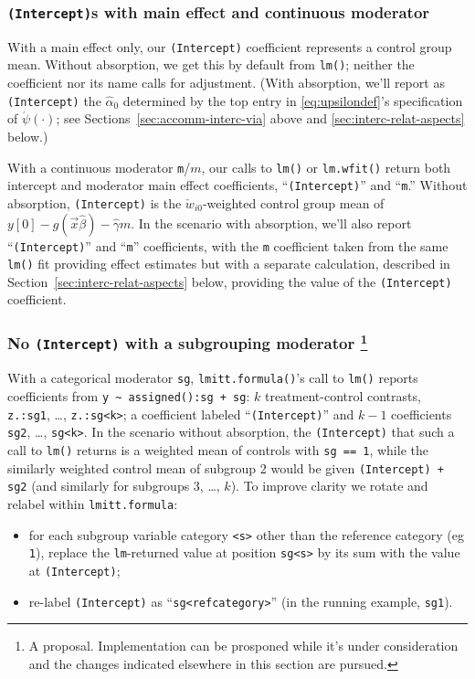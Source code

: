 \documentclass{article}
\newcommand{\owt}[1][{[z_{i}]}]{\ensuremath{\check{w}_{i#1}}}
\begin{document}
\subsubsection{\texttt{(Intercept)}s with main effect and continuous
  moderator}
With a main effect only, our \texttt{(Intercept)} coefficient
represents a control group mean. Without absorption, we get this by
default from \texttt{lm()}; neither the
coefficient nor its name calls for adjustment.  (With absorption, we'll
report as \texttt{(Intercept)} the $\hat{\alpha}_{0}$ determined by
the top entry in \eqref{eq:upsilondef}'s specification of
$\acute{\psi}(\cdot)$; see Sections~\ref{sec:accomm-interc-via} above
and \ref{sec:interc-relat-aspects} below.)

With a continuous moderator \texttt{m}/$m$, our calls to \texttt{lm()} or
\texttt{lm.wfit()} return both intercept and moderator main
effect coefficients, ``\texttt{(Intercept)}'' and ``\texttt{m}.''
Without absorption, \texttt{(Intercept)} is the $\owt[0]$-weighted control group mean of $y[0] - g(\vec{x}\hat\beta) -
\hat{\gamma}m$. In the scenario with absorption, we'll also report
``\texttt{(Intercept)}'' and ``\texttt{m}'' coefficients, with the
\texttt{m} coefficient taken from the same \texttt{lm()} fit providing
effect estimates but with a separate calculation, described in Section~\ref{sec:interc-relat-aspects} below,
providing the value of the \texttt{(Intercept)} coefficient. 

\subsubsection{No \texttt{(Intercept)} with a subgrouping
  moderator%
  \protect\footnote{A proposal. Implementation can be prosponed while
  it's under consideration and the changes indicated elsewhere in this
  section are pursued.}%
}
With a categorical moderator \texttt{sg}, \texttt{lmitt.formula()}'s call to
\texttt{lm()} reports coefficients from \texttt{y
  \textasciitilde\ assigned():sg + sg}: $k$ treatment-control contrasts,
\texttt{z.:sg1}, \ldots, \texttt{z.:sg<k>}; a
coefficient labeled ``\texttt{(Intercept)}'' and $k-1$
coefficients \texttt{sg2}, \ldots, \texttt{sg<k>}.  In the scenario
without absorption, the \texttt{(Intercept)} that such a call to \texttt{lm()}
returns is a weighted mean of
controls with \texttt{sg == 1}, while the similarly weighted control mean
of subgroup 2 would be given \texttt{(Intercept)
+ sg2} (and similarly for subgroups 3, \ldots, $k$).
To improve clarity we rotate and relabel within \texttt{lmitt.formula}:
\begin{itemize}
\item for each subgroup variable category \texttt{<s>} other than the
  reference category (eg \texttt{1}), replace the \texttt{lm}-returned value at
  position \texttt{sg<s>} by its sum with the value at
  \texttt{(Intercept)}; 
\item re-label \texttt{(Intercept)} as
  ``\texttt{sg<refcategory>}'' (in the running
  example, \texttt{sg1}).
\end{itemize}
\end{document}
